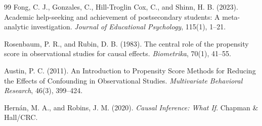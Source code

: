 \documentclass[11pt,letterpaper]{article}
\begin{document}
\begin{thebibliography}{99}
Fong, C. J., Gonzales, C., Hill-Troglin Cox, C., and Shinn, H. B. (2023).
\newblock Academic help-seeking and achievement of postsecondary students: A meta-analytic investigation.
\newblock \emph{Journal of Educational Psychology}, 115(1), 1--21.

Rosenbaum, P. R., and Rubin, D. B. (1983).
\newblock The central role of the propensity score in observational studies for causal effects.
\newblock \emph{Biometrika}, 70(1), 41--55.

Austin, P. C. (2011).
\newblock An Introduction to Propensity Score Methods for Reducing the Effects of Confounding in Observational Studies.
\newblock \emph{Multivariate Behavioral Research}, 46(3), 399--424.

Hern\'{a}n, M. A., and Robins, J. M. (2020).
\newblock \emph{Causal Inference: What If}.
\newblock Chapman \& Hall/CRC.
\end{thebibliography}
\end{document}
